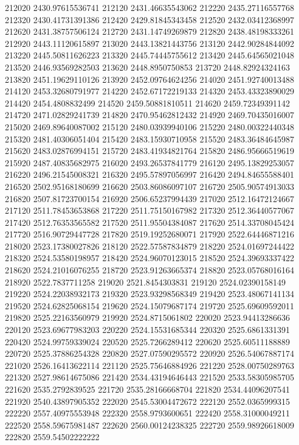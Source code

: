 {212020 2430.97615536741
212120 2431.46635543062
212220 2435.27116557768
212320 2430.41731391386
212420 2429.81845343458
212520 2432.03412368997
212620 2431.38757506124
212720 2431.14749269879
212820 2438.48198333261
212920 2443.11120615897
213020 2443.13821443756
213120 2442.90284844092
213220 2445.50811626223
213320 2445.74445755612
213420 2445.64565021048
213520 2446.93569282503
213620 2448.8950750853
213720 2448.82924324163
213820 2451.19629110126
213920 2452.09764624256
214020 2451.92740013488
214120 2453.32680791977
214220 2452.67172219133
214320 2453.43323890029
214420 2454.4808832499
214520 2459.50881810511
214620 2459.72349391142
214720 2471.02829241739
214820 2470.95462812432
214920 2469.70435016007
215020 2469.89640087002
215120 2480.03939940106
215220 2480.00322440348
215320 2481.40306051404
215420 2483.15930710958
215520 2483.36484645987
215620 2483.02876994151
215720 2483.41934821764
215820 2486.95666519619
215920 2487.40835682975
216020 2493.26537841779
216120 2495.13829253057
216220 2496.21545008321
216320 2495.57897056997
216420 2494.84655588401
216520 2502.95168180699
216620 2503.86086097107
216720 2505.90574913033
216820 2507.81723700154
216920 2506.65237994439
217020 2512.16472124667
217120 2511.78453653868
217220 2511.75150167982
217320 2512.36440577067
217420 2512.76353565582
217520 2511.95504384087
217620 2514.33708045424
217720 2516.90729447728
217820 2519.19252680071
217920 2522.64446871216
218020 2523.17380027826
218120 2522.57587834879
218220 2524.01697244422
218320 2524.53580198957
218420 2524.96070123015
218520 2524.39693337422
218620 2524.21016076255
218720 2523.91263665374
218820 2523.05768016164
218920 2522.7837711258
219020 2521.8454303831
219120 2524.02390158149
219220 2524.22038932173
219320 2523.93298568349
219420 2523.48067141134
219520 2524.62825068154
219620 2524.15079687174
219720 2525.69609592011
219820 2525.22163560979
219920 2524.8715061802
220020 2523.94413286636
220120 2523.69677983203
220220 2524.15531685344
220320 2525.6861331391
220420 2524.99759339024
220520 2525.7266289412
220620 2525.60511188889
220720 2525.37886254328
220820 2527.07590295572
220920 2526.54067887174
221020 2526.16413622114
221120 2525.75646884926
221220 2528.00750289763
221320 2527.98614675086
221420 2534.43194646443
221520 2533.58305985705
221620 2535.2792839525
221720 2535.28166668704
221820 2534.44096207541
221920 2540.43897905352
222020 2545.53004472672
222120 2552.0365999315
222220 2557.40975553948
222320 2558.9793600651
222420 2558.31000049211
222520 2558.59675981487
222620 2560.00124238325
222720 2559.98926618009
222820 2559.54502222222
}

